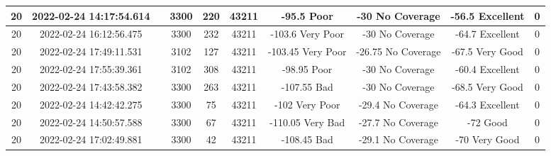 \begin{longtable*}{|c|c|c|c|c|c|c|c|c|c|}
20&2022-02-24 14:17:54.614&&3300&220&43211& -95.5     Poor        & -30       No Coverage & -56.5     Excellent   & 0\\\hline
{}20&2022-02-24 16:12:56.475&&3300&232&43211& -103.6    Very Poor   & -30       No Coverage & -64.7     Excellent   & 0\\\hline
{}20&2022-02-24 17:49:11.531&&3102&127&43211& -103.45   Very Poor   & -26.75    No Coverage & -67.5     Very Good   & 0\\\hline
{}20&2022-02-24 17:55:39.361&&3102&308&43211& -98.95    Poor        & -30       No Coverage & -60.4     Excellent   & 0\\\hline
{}20&2022-02-24 17:43:58.382&&3300&263&43211& -107.55   Bad         & -30       No Coverage & -68.5     Very Good   & 0\\\hline
{}20&2022-02-24 14:42:42.275&&3300&75&43211& -102      Very Poor   & -29.4     No Coverage & -64.3     Excellent   & 0\\\hline
{}20&2022-02-24 14:50:57.588&&3300&67&43211& -110.05   Very Bad    & -27.7     No Coverage & -72       Good        & 0\\\hline
{}20&2022-02-24 17:02:49.881&&3300&42&43211& -108.45   Bad         & -29.1     No Coverage & -70       Very Good   & 0\\\hline

\end{longtable*}
